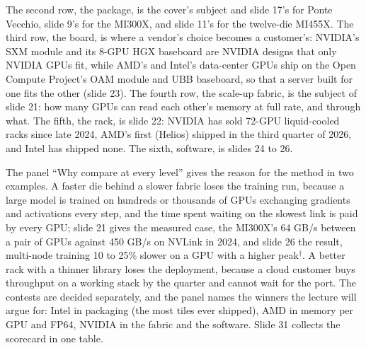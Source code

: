 \documentclass[11pt,letterpaper]{article}
\begin{document}
The second row, the package, is the cover's subject and slide 17's for Ponte Vecchio, slide 9's for the MI300X, and slide 11's for the twelve-die MI455X. The third row, the board, is where a vendor's choice becomes a customer's: NVIDIA's SXM module and its 8-GPU HGX baseboard are NVIDIA designs that only NVIDIA GPUs fit, while AMD's and Intel's data-center GPUs ship on the Open Compute Project's OAM module and UBB baseboard, so that a server built for one fits the other (slide 23). The fourth row, the scale-up fabric, is the subject of slide 21: how many GPUs can read each other's memory at full rate, and through what. The fifth, the rack, is slide 22: NVIDIA has sold 72-GPU liquid-cooled racks since late 2024, AMD's first (Helios) shipped in the third quarter of 2026, and Intel has shipped none. The sixth, software, is slides 24 to 26.

The panel ``Why compare at every level'' gives the reason for the method in two examples. A faster die behind a slower fabric loses the training run, because a large model is trained on hundreds or thousands of GPUs exchanging gradients and activations every step, and the time spent waiting on the slowest link is paid by every GPU; slide 21 gives the measured case, the MI300X's 64 GB/s between a pair of GPUs against 450 GB/s on NVLink in 2024, and slide 26 the result, multi-node training 10 to 25\% slower on a GPU with a higher peak$^\dagger$. A better rack with a thinner library loses the deployment, because a cloud customer buys throughput on a working stack by the quarter and cannot wait for the port. The contests are decided separately, and the panel names the winners the lecture will argue for: Intel in packaging (the most tiles ever shipped), AMD in memory per GPU and FP64, NVIDIA in the fabric and the software. Slide 31 collects the scorecard in one table.
\end{document}
